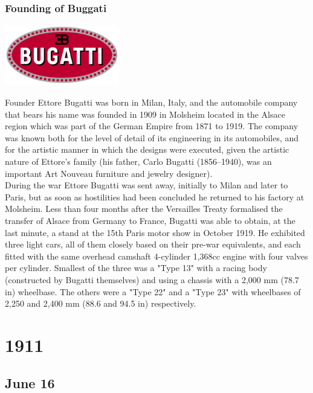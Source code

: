 \documentclass[11pt]{report}
\begin{document}
\subsection{Founding of Buggati}
\vspace{2mm}\begin{center}\includegraphics[width=5cm]{./img/bugattiLogo.jpg}\end{center}
Founder Ettore Bugatti was born in Milan, Italy, and the automobile company that bears his name was founded in 1909 in Molsheim located in the Alsace region which was part of the German Empire from 1871 to 1919. The company was known both for the level of detail of its engineering in its automobiles, and for the artistic manner in which the designs were executed, given the artistic nature of Ettore's family (his father, Carlo Bugatti (1856–1940), was an important Art Nouveau furniture and jewelry designer).\\ \indent During the war Ettore Bugatti was sent away, initially to Milan and later to Paris, but as soon as hostilities had been concluded he returned to his factory at Molsheim. Less than four months after the Versailles Treaty formalised the transfer of Alsace from Germany to France, Bugatti was able to obtain, at the last minute, a stand at the 15th Paris motor show in October 1919. He exhibited three light cars, all of them closely based on their pre-war equivalents, and each fitted with the same overhead camshaft 4-cylinder 1,368cc engine with four valves per cylinder. Smallest of the three was a "Type 13" with a racing body (constructed by Bugatti themselves) and using a chassis with a 2,000 mm (78.7 in) wheelbase. The others were a "Type 22" and a "Type 23" with wheelbases of 2,250 and 2,400 mm (88.6 and 94.5 in) respectively.

\chapter{1911}
\section{June 16}
\end{document}
